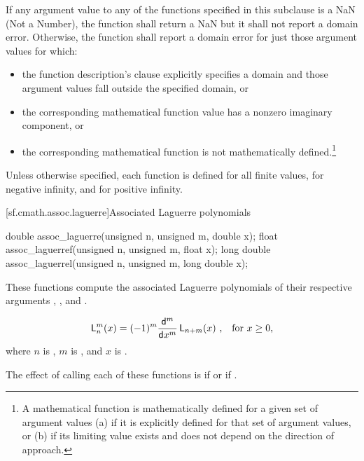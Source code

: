 \pnum
{}%
If any argument value
to any of the functions specified in this subclause
is a NaN (Not a Number),
the function shall return a NaN
but it shall not report a domain error.
Otherwise,
the function shall report a domain error
for just those argument values
for which:
\begin{itemize}
  \item
  the function description's \returns clause
  explicitly specifies a domain
  and those argument values fall
  outside the specified domain,
  or

  \item
  the corresponding mathematical function value
  has a nonzero imaginary component,
  or

  \item
  the corresponding mathematical function
  is not mathematically defined.\footnote{%
    A mathematical function
    is mathematically defined
    for a given set of argument values
    (a)
      if it is explicitly defined
      for that set of argument values,
      or
    (b)
      if its limiting value exists
      and does not depend
      on the direction of approach.}
\end{itemize}

\pnum
Unless otherwise specified,
each function is defined
for all finite values,
for negative infinity,
and for positive infinity.

[sf.cmath.assoc.laguerre]{Associated Laguerre polynomials}%
%
%
%
%
%
\begin{itemdecl}
double       assoc_laguerre(unsigned n, unsigned m, double x);
float        assoc_laguerref(unsigned n, unsigned m, float x);
long double  assoc_laguerrel(unsigned n, unsigned m, long double x);
\end{itemdecl}

\begin{itemdescr}
\pnum
\effects
These functions compute
the associated Laguerre polynomials
of their respective arguments
, , and .

\pnum
\returns
\[ \mathsf{L}_n^m(x) =
   (-1)^m \frac{\mathsf{d} ^ m}{\mathsf{d}x ^ m} \, \mathsf{L}_{n+m}(x)
   \text{ ,\quad for $x \ge 0$,} \]
where
$n$ is ,
$m$ is , and
$x$ is .

\pnum
\remarks
The effect of calling each of these functions
is 
if  or if .
\end{itemdescr}

